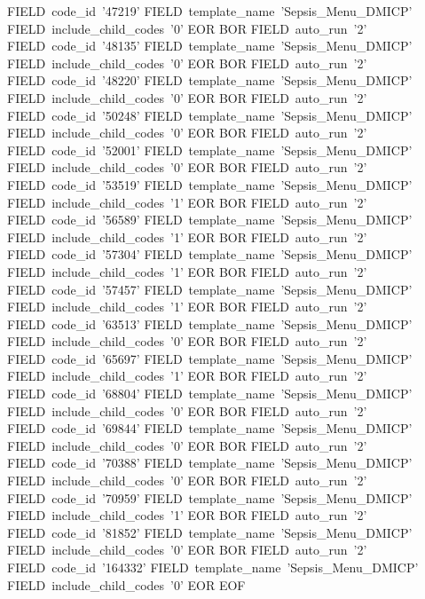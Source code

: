     FIELD~code_id~'47219'
    FIELD~template_name~'Sepsis_Menu_DMICP'
    FIELD~include_child_codes~'0'
  EOR
  BOR
    FIELD~auto_run~'2'
    FIELD~code_id~'48135'
    FIELD~template_name~'Sepsis_Menu_DMICP'
    FIELD~include_child_codes~'0'
  EOR
  BOR
    FIELD~auto_run~'2'
    FIELD~code_id~'48220'
    FIELD~template_name~'Sepsis_Menu_DMICP'
    FIELD~include_child_codes~'0'
  EOR
  BOR
    FIELD~auto_run~'2'
    FIELD~code_id~'50248'
    FIELD~template_name~'Sepsis_Menu_DMICP'
    FIELD~include_child_codes~'0'
  EOR
  BOR
    FIELD~auto_run~'2'
    FIELD~code_id~'52001'
    FIELD~template_name~'Sepsis_Menu_DMICP'
    FIELD~include_child_codes~'0'
  EOR
  BOR
    FIELD~auto_run~'2'
    FIELD~code_id~'53519'
    FIELD~template_name~'Sepsis_Menu_DMICP'
    FIELD~include_child_codes~'1'
  EOR
  BOR
    FIELD~auto_run~'2'
    FIELD~code_id~'56589'
    FIELD~template_name~'Sepsis_Menu_DMICP'
    FIELD~include_child_codes~'1'
  EOR
  BOR
    FIELD~auto_run~'2'
    FIELD~code_id~'57304'
    FIELD~template_name~'Sepsis_Menu_DMICP'
    FIELD~include_child_codes~'1'
  EOR
  BOR
    FIELD~auto_run~'2'
    FIELD~code_id~'57457'
    FIELD~template_name~'Sepsis_Menu_DMICP'
    FIELD~include_child_codes~'1'
  EOR
  BOR
    FIELD~auto_run~'2'
    FIELD~code_id~'63513'
    FIELD~template_name~'Sepsis_Menu_DMICP'
    FIELD~include_child_codes~'0'
  EOR
  BOR
    FIELD~auto_run~'2'
    FIELD~code_id~'65697'
    FIELD~template_name~'Sepsis_Menu_DMICP'
    FIELD~include_child_codes~'1'
  EOR
  BOR
    FIELD~auto_run~'2'
    FIELD~code_id~'68804'
    FIELD~template_name~'Sepsis_Menu_DMICP'
    FIELD~include_child_codes~'0'
  EOR
  BOR
    FIELD~auto_run~'2'
    FIELD~code_id~'69844'
    FIELD~template_name~'Sepsis_Menu_DMICP'
    FIELD~include_child_codes~'0'
  EOR
  BOR
    FIELD~auto_run~'2'
    FIELD~code_id~'70388'
    FIELD~template_name~'Sepsis_Menu_DMICP'
    FIELD~include_child_codes~'0'
  EOR
  BOR
    FIELD~auto_run~'2'
    FIELD~code_id~'70959'
    FIELD~template_name~'Sepsis_Menu_DMICP'
    FIELD~include_child_codes~'1'
  EOR
  BOR
    FIELD~auto_run~'2'
    FIELD~code_id~'81852'
    FIELD~template_name~'Sepsis_Menu_DMICP'
    FIELD~include_child_codes~'0'
  EOR
  BOR
    FIELD~auto_run~'2'
    FIELD~code_id~'164332'
    FIELD~template_name~'Sepsis_Menu_DMICP'
    FIELD~include_child_codes~'0'
  EOR
EOF

